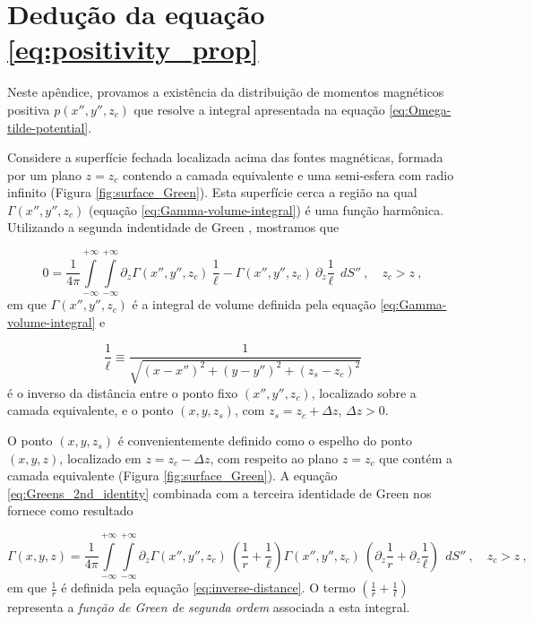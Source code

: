 \chapter{Dedução da equação \ref{eq:positivity_prop}}
\label{append:proof-positive-p}

Neste apêndice, provamos a existência da distribuição de momentos magnéticos positiva $p(x'', y'', z_{c})$ que resolve a integral apresentada na equação \ref{eq:Omega-tilde-potential}. 

Considere a superfície fechada localizada acima das fontes magnéticas, formada por um plano $z = z_{c}$ contendo a camada equivalente e uma semi-esfera com radio infinito (Figura \ref{fig:surface_Green}). Esta superfície cerca a região na qual  $\Gamma(x'', y'', z_{c})$ (equação \ref{eq:Gamma-volume-integral}) é uma função harmônica. Utilizando a segunda indentidade de Green \citep[][ p. 215]{kellogg1967}, mostramos que 

\begin{equation}
0 = \frac{1}{4\pi}
\int\limits_{-\infty}^{+\infty}\int\limits_{-\infty}^{+\infty}
\partial_{z} \Gamma(x'', y'', z_{c}) \: \frac{1}{\ell} - 
\Gamma(x'', y'', z_{c}) \: \partial_{z} \frac{1}{\ell}
\:\: dS'' \: , \quad z_{c} > z \: ,
\label{eq:Greens_2nd_identity}
\end{equation}
em que $\Gamma(x'', y'', z_{c})$ é a integral de volume definida pela equação \ref{eq:Gamma-volume-integral} e 

\begin{equation}
\frac{1}{\ell} \equiv \frac{1}{\sqrt{(x - x'')^{2} +
		(y - y'')^{2} +
		(z_{s} - z_{c})^{2}}}
\label{eq:inv-l}
\end{equation}
é o inverso da distância entre o ponto fixo $(x'', y'', z_{c})$, localizado sobre a camada equivalente, e o ponto $(x, y, z_{s})$, com $z_{s} = z_{c} + \Delta z$, $\Delta z > 0$. 

O ponto $(x, y, z_{s})$ é convenientemente definido como o espelho do ponto $(x, y, z)$, localizado em $z = z_{c} - \Delta z$, com respeito ao plano $z = z_{c}$ que contém a camada equivalente (Figura \ref{fig:surface_Green}). A equação \ref{eq:Greens_2nd_identity} combinada com a terceira identidade de Green \citep[][ p. 219]{kellogg1967} nos fornece como resultado 

\begin{equation}
\Gamma(x, y, z) = \frac{1}{4\pi}
\int\limits_{-\infty}^{+\infty}\int\limits_{-\infty}^{+\infty}
\partial_{z} \Gamma(x'', y'', z_{c}) \: 
\left( \frac{1}{r} + \frac{1}{\ell} \right)
\Gamma(x'', y'', z_{c}) \: 
\left( \partial_{z} \frac{1}{r} + \partial_{z} \frac{1}{\ell} \right)
\:\: dS'' \: , \quad z_{c} > z \: ,
\label{eq:Greens_3rd_identity}
\end{equation}
em que $\frac{1}{r}$ é definida pela equação \ref{eq:inverse-distance}. O termo $\left( \frac{1}{r} + \frac{1}{\ell} \right)$ representa a \textit{função de Green de segunda ordem} \citep[][ p. 246]{kellogg1967} associada a esta integral. 

